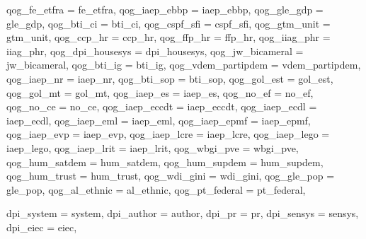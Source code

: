 \documentclass[
]{article}
\newenvironment{Shaded}{\begin{snugshade}}{\end{snugshade}}
\newcommand{\DataTypeTok}[1]{\textcolor[rgb]{0.13,0.29,0.53}{#1}}
\newcommand{\NormalTok}[1]{#1}
\begin{document}
\begin{Shaded}
\begin{Highlighting}[]
{                \DataTypeTok{qog_fe_etfra =}\NormalTok{ fe_etfra,}
                \DataTypeTok{qog_iaep_ebbp =}\NormalTok{ iaep_ebbp,}
                \DataTypeTok{qog_gle_gdp =}\NormalTok{ gle_gdp,}
                \DataTypeTok{qog_bti_ci =}\NormalTok{ bti_ci,}
                \DataTypeTok{qog_cspf_sfi =}\NormalTok{ cspf_sfi,}
                \DataTypeTok{qog_gtm_unit =}\NormalTok{ gtm_unit,}
                \DataTypeTok{qog_ccp_hr =}\NormalTok{ ccp_hr,}
                \DataTypeTok{qog_ffp_hr =}\NormalTok{ ffp_hr, }
                \DataTypeTok{qog_iiag_phr =}\NormalTok{ iiag_phr,}
                \DataTypeTok{qog_dpi_housesys =}\NormalTok{ dpi_housesys,}
                \DataTypeTok{qog_jw_bicameral =}\NormalTok{ jw_bicameral,}
                \DataTypeTok{qog_bti_ig =}\NormalTok{ bti_ig, }
                \DataTypeTok{qog_vdem_partipdem =}\NormalTok{ vdem_partipdem,}
                \DataTypeTok{qog_iaep_nr =}\NormalTok{ iaep_nr,}
                \DataTypeTok{qog_bti_sop =}\NormalTok{ bti_sop,}
                \DataTypeTok{qog_gol_est =}\NormalTok{ gol_est,}
                \DataTypeTok{qog_gol_mt =}\NormalTok{ gol_mt,}
                \DataTypeTok{qog_iaep_es =}\NormalTok{ iaep_es,}
                \DataTypeTok{qog_no_ef =}\NormalTok{ no_ef,}
                \DataTypeTok{qog_no_ce =}\NormalTok{ no_ce,}
                \DataTypeTok{qog_iaep_eccdt =}\NormalTok{ iaep_eccdt,}
                \DataTypeTok{qog_iaep_ecdl =}\NormalTok{ iaep_ecdl,}
                \DataTypeTok{qog_iaep_eml =}\NormalTok{ iaep_eml,}
                \DataTypeTok{qog_iaep_epmf =}\NormalTok{ iaep_epmf,}
                \DataTypeTok{qog_iaep_evp =}\NormalTok{ iaep_evp,}
                \DataTypeTok{qog_iaep_lcre =}\NormalTok{ iaep_lcre,}
                \DataTypeTok{qog_iaep_lego =}\NormalTok{ iaep_lego,}
                \DataTypeTok{qog_iaep_lrit =}\NormalTok{ iaep_lrit,}
                \DataTypeTok{qog_wbgi_pve =}\NormalTok{ wbgi_pve,}
                \DataTypeTok{qog_hum_satdem =}\NormalTok{ hum_satdem,}
                \DataTypeTok{qog_hum_supdem =}\NormalTok{ hum_supdem,}
                \DataTypeTok{qog_hum_trust =}\NormalTok{ hum_trust,}
                \DataTypeTok{qog_wdi_gini =}\NormalTok{ wdi_gini,}
                \DataTypeTok{qog_gle_pop =}\NormalTok{ gle_pop,}
                \DataTypeTok{qog_al_ethnic =}\NormalTok{ al_ethnic,}
                \DataTypeTok{qog_pt_federal =}\NormalTok{ pt_federal,}
                
                \DataTypeTok{dpi_system =}\NormalTok{ system,}
                \DataTypeTok{dpi_author =}\NormalTok{ author,}
                \DataTypeTok{dpi_pr =}\NormalTok{ pr,}
                \DataTypeTok{dpi_sensys =}\NormalTok{ sensys,}
                \DataTypeTok{dpi_eiec =}\NormalTok{ eiec,}
                
}
\end{Highlighting}
\end{Shaded}
\end{document}
